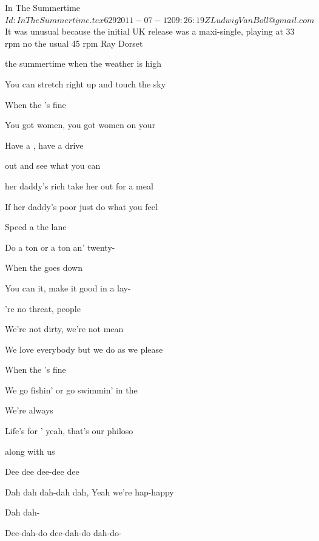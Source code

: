 \begin{SBSong}{In The Summertime}
  {$Id: InTheSummertime.tex 629 2011-07-12 09:26:19Z LudwigVanBoll@gmail.com $}
  {It was unusual because the initial UK release was a maxi-single, playing at 33 rpm no the usual 45 rpm}
  {Ray Dorset}
  \begin{SBVerse}
     the summertime when the weather is high

    You can stretch right up and touch the sky

    When the 's fine

    You got women, you got women on your 

    Have a , have a drive

     out and see what you can 
  \end{SBVerse}
  \begin{SBVerse}
     her daddy's rich take her out for a meal

    If her daddy's poor just do what you feel

    Speed a the lane

    Do a ton or a ton an' twenty-

    When the  goes down

    You can  it, make it good in a lay-
  \end{SBVerse}
  \begin{SBVerse}
    're no threat, people

    We're not dirty, we're not mean

    We love everybody but we do as we please

    When the 's fine

    We go fishin' or go swimmin' in the 

    We're always 

    Life's for ' yeah, that's our philoso
  \end{SBVerse}
  \CBPageBrk
  \begin{SBVerse}
     along with us

    Dee dee dee-dee dee

    Dah dah dah-dah dah, Yeah we're hap-happy

    Dah dah-

    Dee-dah-do dee-dah-do dah-do-


\end{SBVerse}
\end{SBSong}
